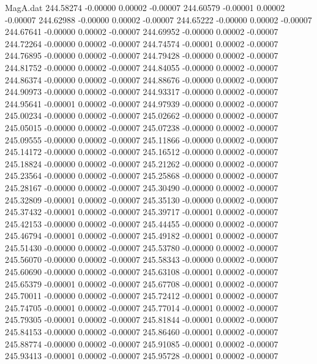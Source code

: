 \begin{filecontents}{MagA.dat}
 244.58274   -0.00000    0.00002   -0.00007
 244.60579   -0.00001    0.00002   -0.00007
 244.62988   -0.00000    0.00002   -0.00007
 244.65222   -0.00000    0.00002   -0.00007
 244.67641   -0.00000    0.00002   -0.00007
 244.69952   -0.00000    0.00002   -0.00007
 244.72264   -0.00000    0.00002   -0.00007
 244.74574   -0.00001    0.00002   -0.00007
 244.76895   -0.00000    0.00002   -0.00007
 244.79428   -0.00000    0.00002   -0.00007
 244.81752   -0.00000    0.00002   -0.00007
 244.84055   -0.00000    0.00002   -0.00007
 244.86374   -0.00000    0.00002   -0.00007
 244.88676   -0.00000    0.00002   -0.00007
 244.90973   -0.00000    0.00002   -0.00007
 244.93317   -0.00000    0.00002   -0.00007
 244.95641   -0.00001    0.00002   -0.00007
 244.97939   -0.00000    0.00002   -0.00007
 245.00234   -0.00000    0.00002   -0.00007
 245.02662   -0.00000    0.00002   -0.00007
 245.05015   -0.00000    0.00002   -0.00007
 245.07238   -0.00000    0.00002   -0.00007
 245.09555   -0.00000    0.00002   -0.00007
 245.11866   -0.00000    0.00002   -0.00007
 245.14172   -0.00000    0.00002   -0.00007
 245.16512   -0.00000    0.00002   -0.00007
 245.18824   -0.00000    0.00002   -0.00007
 245.21262   -0.00000    0.00002   -0.00007
 245.23564   -0.00000    0.00002   -0.00007
 245.25868   -0.00000    0.00002   -0.00007
 245.28167   -0.00000    0.00002   -0.00007
 245.30490   -0.00000    0.00002   -0.00007
 245.32809   -0.00001    0.00002   -0.00007
 245.35130   -0.00000    0.00002   -0.00007
 245.37432   -0.00001    0.00002   -0.00007
 245.39717   -0.00001    0.00002   -0.00007
 245.42153   -0.00000    0.00002   -0.00007
 245.44455   -0.00000    0.00002   -0.00007
 245.46794   -0.00001    0.00002   -0.00007
 245.49182   -0.00001    0.00002   -0.00007
 245.51430   -0.00000    0.00002   -0.00007
 245.53780   -0.00000    0.00002   -0.00007
 245.56070   -0.00000    0.00002   -0.00007
 245.58343   -0.00000    0.00002   -0.00007
 245.60690   -0.00000    0.00002   -0.00007
 245.63108   -0.00001    0.00002   -0.00007
 245.65379   -0.00001    0.00002   -0.00007
 245.67708   -0.00001    0.00002   -0.00007
 245.70011   -0.00000    0.00002   -0.00007
 245.72412   -0.00001    0.00002   -0.00007
 245.74705   -0.00001    0.00002   -0.00007
 245.77014   -0.00001    0.00002   -0.00007
 245.79305   -0.00001    0.00002   -0.00007
 245.81844   -0.00001    0.00002   -0.00007
 245.84153   -0.00000    0.00002   -0.00007
 245.86460   -0.00001    0.00002   -0.00007
 245.88774   -0.00000    0.00002   -0.00007
 245.91085   -0.00001    0.00002   -0.00007
 245.93413   -0.00001    0.00002   -0.00007
 245.95728   -0.00001    0.00002   -0.00007

\end{filecontents}
